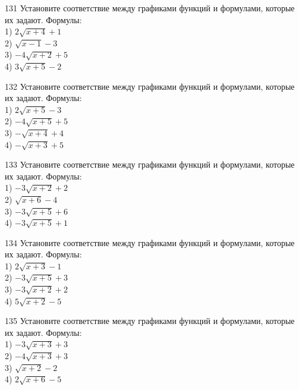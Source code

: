 \documentclass[4apaper]{article}
\begin{document}
\begin{taskBN}{131}
Установите соответствие между графиками функций и формулами, которые их задают. Формулы: \\1) $2\sqrt{x+4}+1$\\2) $\sqrt{x-1}-3$\\3) $-4\sqrt{x+2}+5$\\4) $3\sqrt{x+5}-2$
\end{taskBN}

\begin{taskBN}{132}
Установите соответствие между графиками функций и формулами, которые их задают. Формулы: \\1) $2\sqrt{x+5}-3$\\2) $-4\sqrt{x+5}+5$\\3) $-\sqrt{x+4}+4$\\4) $-\sqrt{x+3}+5$
\end{taskBN}

\begin{taskBN}{133}
Установите соответствие между графиками функций и формулами, которые их задают. Формулы: \\1) $-3\sqrt{x+2}+2$\\2) $\sqrt{x+6}-4$\\3) $-3\sqrt{x+5}+6$\\4) $-3\sqrt{x+5}+1$
\end{taskBN}

\begin{taskBN}{134}
Установите соответствие между графиками функций и формулами, которые их задают. Формулы: \\1) $2\sqrt{x+3}-1$\\2) $-3\sqrt{x+5}+3$\\3) $-3\sqrt{x+2}+2$\\4) $5\sqrt{x+2}-5$
\end{taskBN}

\begin{taskBN}{135}
Установите соответствие между графиками функций и формулами, которые их задают. Формулы: \\1) $-3\sqrt{x+3}+3$\\2) $-4\sqrt{x+3}+3$\\3) $\sqrt{x+2}-2$\\4) $2\sqrt{x+6}-5$
\end{taskBN}
\end{document}
